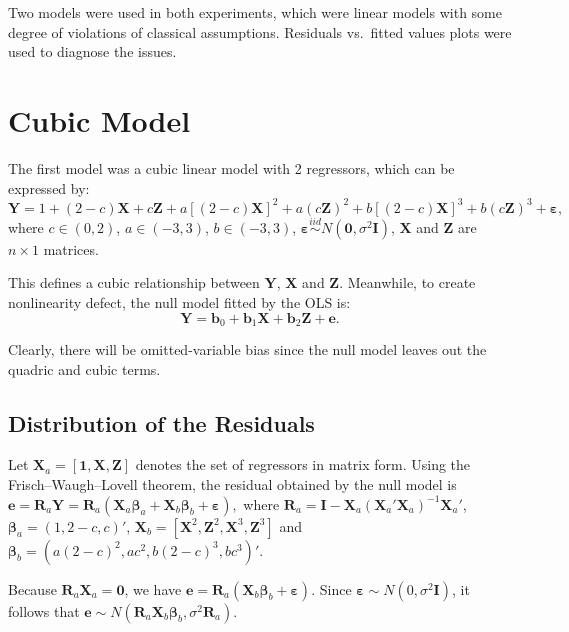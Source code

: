 \documentclass{monashthesis}
\begin{document}
Two models were used in both experiments, which were linear models with some degree of violations of classical assumptions. Residuals vs.~fitted values plots were used to diagnose the issues.

\hypertarget{cubic-model}{%
\section{Cubic Model}\label{cubic-model}}

The first model was a cubic linear model with 2 regressors, which can be expressed by: \[\boldsymbol{Y}= 1 + (2-c)\boldsymbol{X} + c\boldsymbol{Z} + a[(2-c)\boldsymbol{X}]^2+a(c\boldsymbol{Z})^2+b[(2-c)\boldsymbol{X}]^3+b(c\boldsymbol{Z})^3+\boldsymbol{\varepsilon},\] where \(c \in (0,2)\), \(a \in (-3,3)\), \(b \in (-3,3)\), \(\boldsymbol{\varepsilon}\overset{iid}{\sim} N(\boldsymbol{0},\sigma^2\boldsymbol{I})\), \(\boldsymbol{X}\) and \(\boldsymbol{Z}\) are \(n\times1\) matrices.

This defines a cubic relationship between \(\boldsymbol{Y}\), \(\boldsymbol{X}\) and \(\boldsymbol{Z}\). Meanwhile, to create nonlinearity defect, the null model fitted by the OLS is: \[\boldsymbol{Y}=\boldsymbol{b}_0+\boldsymbol{b}_1\boldsymbol{X}+\boldsymbol{b}_2\boldsymbol{Z}+\boldsymbol{e}.\]

Clearly, there will be omitted-variable bias since the null model leaves out the quadric and cubic terms.

\hypertarget{distribution-of-the-residuals}{%
\subsection{Distribution of the Residuals}\label{distribution-of-the-residuals}}

Let \(\boldsymbol{X}_a=[\boldsymbol{1},\boldsymbol{X},\boldsymbol{Z}]\) denotes the set of regressors in matrix form. Using the Frisch--Waugh--Lovell theorem, the residual obtained by the null model is \(\boldsymbol{e}=\boldsymbol{R}_a\boldsymbol{Y}=\boldsymbol{R}_a(\boldsymbol{X}_a\boldsymbol{\beta}_a+\boldsymbol{X}_b\boldsymbol{\beta}_b+\boldsymbol{\varepsilon}),\) where \(\boldsymbol{R}_a=\boldsymbol{I}-\boldsymbol{X}_a(\boldsymbol{X}_a'\boldsymbol{X}_a)^{-1}\boldsymbol{X}_a'\), \(\boldsymbol{\beta}_a=(1,2-c,c)'\), \(\boldsymbol{X}_b=[\boldsymbol{X}^2,\boldsymbol{Z}^2,\boldsymbol{X}^3,\boldsymbol{Z}^3]\) and \(\boldsymbol{\beta}_b=(a(2-c)^2,ac^2,b(2-c)^3,bc^3)'\).

Because \(\boldsymbol{R}_a\boldsymbol{X}_a=\boldsymbol{0}\), we have \(\boldsymbol{e}=\boldsymbol{R}_a(\boldsymbol{X}_b\boldsymbol{\beta}_b+\boldsymbol{\varepsilon}).\) Since \(\boldsymbol{\varepsilon} \sim N(0,\sigma^2\boldsymbol{I})\), it follows that \(\boldsymbol{e} \sim N(\boldsymbol{R}_a\boldsymbol{X}_b\boldsymbol{\beta}_b, \sigma^2\boldsymbol{R}_a)\).
\end{document}
